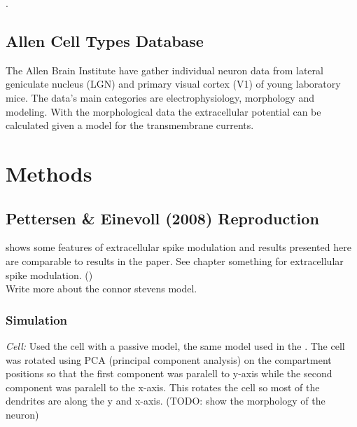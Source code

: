 \documentclass[altfont, fleqn]{uiophd}
\begin{document}
\cite{mountcastle_cortical_1969}.

\section{Allen Cell Types Database}
The Allen Brain Institute have gather individual neuron data from lateral geniculate
nucleus (LGN) and primary visual cortex (V1) of young laboratory mice. 
The data's main categories are electrophysiology, morphology and modeling.
With the morphological data the extracellular potential can be calculated given
a model for the transmembrane currents. 
\chapter{Methods}
\vspace{1em} 
\startcontents
{}
\section{Pettersen \& Einevoll (2008) Reproduction}
\textcite{pettersen_amplitude_2008} shows some features of extracellular 
spike modulation and
results presented here are comparable to results in the paper. 
See chapter something for extracellular spike modulation.
(\cite{pettersen_amplitude_2008}) \\

Write more about the connor stevens model.

\subsection{Simulation}
\emph{Cell:}
Used the \textcite{mainen_influence_1996} cell with a passive model, 
the same model used in the \textcite{pettersen_amplitude_2008}. 
The cell was rotated using PCA (principal component analysis) on the compartment
positions
so that the first component was paralell to y-axis while the second component
was paralell to the x-axis. This rotates the cell so most of the dendrites are along
the y and x-axis. (TODO: show the morphology of the neuron)\\
\end{document}

